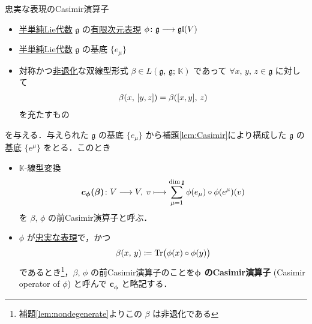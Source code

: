 \documentclass[rep_main]{subfiles}
\begin{document}
\begin{mydef}[label=def:Casimir,breakable]{忠実な表現のCasimir演算子}
	\begin{itemize}
		\item \hyperref[def:semisimple-LieAlg]{半単純Lie代数} $\mathfrak{g}$ の\underline{有限次元}\hyperref[ax:g-module]{表現} $\phi \colon \mathfrak{g} \longrightarrow \mathfrak{gl}(V)$
		\item \hyperref[de:semisimple-LieAlg]{半単純Lie代数} $\mathfrak{g}$ の基底 $\{e_\mu\}$
		\item 対称かつ\hyperref[def:radical-bilinear]{非退化}な双線型形式 $\beta \in L(\mathfrak{g},\, \mathfrak{g};\, \mathbb{K})$
		であって $\forall x,\, y,\, z \in \mathfrak{g}$ に対して
		\begin{align}
			\beta(x,\, \comm{y}{z}) = \beta (\comm{x}{y},\, z)
		\end{align}
		を充たすもの
	\end{itemize}
	を与える．与えられた $\mathfrak{g}$ の基底 $\{e_\mu\}$ から補題\ref{lem:Casimir}により構成した $\mathfrak{g}$ の基底 $\{e^\mu\}$ をとる．このとき

	\begin{itemize}
		\item $\mathbb{K}$-線型変換
		\begin{align}
			\bm{c_\phi(\beta)} \colon V \longrightarrow V,\; v \longmapsto \sum_{\mu = 1}^{\dim \mathfrak{g}} \phi(e_\mu) \circ \phi(e^\mu) (v)
		\end{align}
		を $\beta,\, \phi$ の前Casimir演算子と呼ぶ．
		\item $\phi$ が\hyperref[def:faithful]{忠実な表現}で，かつ
		\begin{align}
			\beta(x,\, y) \coloneqq \Tr \bigl(\phi(x) \circ \phi(y) \bigr) 
		\end{align}
		であるとき\footnote{補題\ref{lem:nondegenerate}よりこの $\beta$ は非退化である}，$\beta,\, \phi$ の前Casimir演算子のことを\textbf{$\bm{\phi}$ のCasimir演算子} (Casimir operator of $\phi$) と呼んで $\bm{c_\phi}$ と略記する．
	\end{itemize}
\end{mydef}
\end{document}
